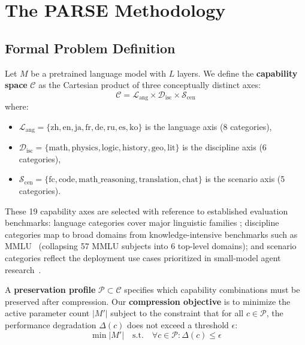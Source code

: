 \documentclass[twocolumn]{article}
\begin{document}
\section{The PARSE Methodology}

\subsection{Formal Problem Definition}

Let $M$ be a pretrained language model with $L$ layers.
We define the \textbf{capability space} $\mathcal{C}$ as the Cartesian product of three conceptually distinct axes:
\begin{equation}
\mathcal{C} = \mathcal{L}_{\text{ang}} \times \mathcal{D}_{\text{isc}} \times \mathcal{S}_{\text{cen}}
\end{equation}
where:
\begin{itemize}[leftmargin=*]
\item $\mathcal{L}_{\text{ang}} = \{\text{zh}, \text{en}, \text{ja}, \text{fr}, \text{de}, \text{ru}, \text{es}, \text{ko}\}$ is the language axis (8 categories),
\item $\mathcal{D}_{\text{isc}} = \{\text{math}, \text{physics}, \text{logic}, \text{history}, \text{geo}, \text{lit}\}$ is the discipline axis (6 categories),
\item $\mathcal{S}_{\text{cen}} = \{\text{fc}, \text{code}, \text{math\_reasoning}, \text{translation}, \text{chat}\}$ is the scenario axis (5 categories).
\end{itemize}

These 19 capability axes are selected with reference to established evaluation benchmarks: language categories cover major linguistic families \citep{conneau2018xnli}; discipline categories map to broad domains from knowledge-intensive benchmarks such as MMLU~\citep{hendrycks2021mmlu} (collapsing 57 MMLU subjects into 6 top-level domains); and scenario categories reflect the deployment use cases prioritized in small-model agent research~\citep{zhang2024xlam,erdogan2024tinyagent,wang2024toolflow,sharma2025slm,haque2025tinyllm}.

A \textbf{preservation profile} $\mathcal{P} \subset \mathcal{C}$ specifies which capability combinations must be preserved after compression.
Our \textbf{compression objective} is to minimize the active parameter count $|M'|$ subject to the constraint that for all $c \in \mathcal{P}$, the performance degradation $\Delta(c)$ does not exceed a threshold $\epsilon$:
\begin{equation}
\min |M'| \quad \text{s.t.} \quad \forall c \in \mathcal{P}: \Delta(c) \leq \epsilon
\end{equation}
\end{document}
